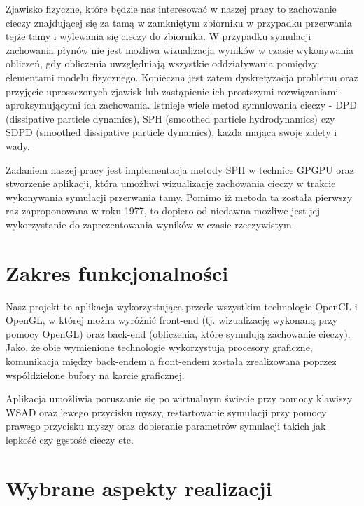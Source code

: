 \documentclass[polish, 12pt]{aghthesis}
\begin{document}
	Zjawisko fizyczne, które będzie nas interesować w naszej pracy to zachowanie cieczy znajdującej się za tamą w zamkniętym zbiorniku w przypadku przerwania tejże tamy i wylewania się cieczy do zbiornika. W przypadku symulacji zachowania płynów nie jest możliwa wizualizacja wyników w czasie wykonywania obliczeń, gdy obliczenia uwzględniają wszystkie oddziaływania pomiędzy elementami modelu fizycznego. Konieczna jest zatem dyskretyzacja problemu oraz przyjęcie uproszczonych zjawisk lub zastąpienie ich prostszymi rozwiązaniami aproksymującymi ich zachowania. Istnieje wiele metod symulowania cieczy - DPD (dissipative particle dynamics), SPH (smoothed particle hydrodynamics) czy SDPD (smoothed dissipative particle dynamics), każda mająca swoje zalety i wady.

	Zadaniem naszej pracy jest implementacja metody SPH w technice GPGPU oraz stworzenie aplikacji, która umożliwi wizualizację zachowania cieczy w trakcie wykonywania symulacji przerwania tamy. Pomimo iż metoda ta została pierwszy raz zaproponowana w roku 1977, to dopiero od niedawna możliwe jest jej wykorzystanie do zaprezentowania wyników w czasie rzeczywistym.


\section{Zakres funkcjonalności}

	Nasz projekt to aplikacja wykorzystująca przede wszystkim technologie OpenCL i OpenGL, w której można wyróżnić front-end (tj. wizualizację wykonaną przy pomocy OpenGL) oraz back-end (obliczenia, które symulują zachowanie cieczy). Jako, że obie wymienione technologie wykorzystują procesory graficzne, komunikacja między back-endem a front-endem została zrealizowana poprzez współdzielone bufory na karcie graficznej. 

	Aplikacja umożliwia poruszanie się po wirtualnym świecie przy pomocy klawiszy WSAD oraz lewego przycisku myszy, restartowanie symulacji przy pomocy prawego przycisku myszy oraz dobieranie parametrów symulacji takich jak lepkość czy gęstość cieczy etc.


\section{Wybrane aspekty realizacji}
\end{document}
